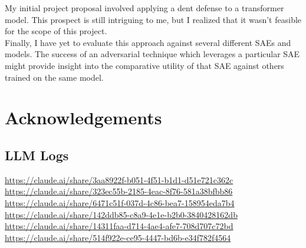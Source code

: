 \documentclass{article}
\begin{document}
My initial project proposal involved applying a dent defense to a transformer model. This prospect is still intriguing to me, but I realized that it wasn't feasible for the scope of this project. \\

Finally, I have yet to evaluate this approach against several different SAEs and models. The success of an adversarial technique which leverages a particular SAE might provide insight into the comparative utility of that SAE against others trained on the same model. 

\section*{Acknowledgements} 

\subsection*{LLM Logs}

\url{https://claude.ai/share/3aa8922f-b051-4f51-b1d1-d51e721c362c}\\

\url{https://claude.ai/share/323ec55b-2185-4eac-8f76-581a38bfbb86}\\

\url{https://claude.ai/share/6471c51f-037d-4c86-bea7-158954eda7b4}\\

\url{https://claude.ai/share/142ddb85-c8a9-4e1e-b2b0-3840428162db}\\

\url{https://claude.ai/share/14311faa-d714-4ae4-afe7-708d707c72bd}\\

\url{https://claude.ai/share/514f922e-ce95-4447-bd6b-e34f782f4564}

 

\end{document}
